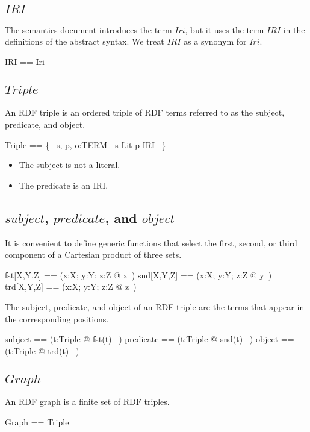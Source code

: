 \documentclass{article}
\begin{document}
\subsection{$IRI$}
The semantics document introduces the term $Iri$, but it uses the term $IRI$ in the definitions of the abstract syntax.
We treat $IRI$ as a synonym for $Iri$.
\begin{zed}
	IRI == Iri
\end{zed}

\subsection{$Triple$}
An RDF triple is an ordered triple of RDF terms referred to as the subject, predicate, and object.
\begin{zed}
	Triple == \{~ s, p, o:TERM | s \notin Lit \land p \in IRI ~\}
\end{zed}
\begin{itemize}
\item The subject is not a literal.
\item The predicate is an IRI.
\end{itemize}

\subsection{$subject$, $predicate$, and $object$}
It is convenient to define generic functions that select the first, second, or third component of a Cartesian product of three sets.
\begin{zed}
	fst[X,Y,Z] == (\lambda x:X; y:Y; z:Z @ x~)
\also
	snd[X,Y,Z] == (\lambda x:X; y:Y; z:Z @ y~)
\also
	trd[X,Y,Z] == (\lambda x:X; y:Y; z:Z @ z~)
\end{zed}

The subject, predicate, and object of an RDF triple are the terms that appear in the corresponding positions.
\begin{zed}
	subject == (\lambda t:Triple @ fst(t) ~)
\also
	predicate == (\lambda t:Triple @ snd(t) ~)
\also
	object == (\lambda t:Triple @ trd(t) ~)
\end{zed}

\subsection{$Graph$}
An RDF graph is a finite set of RDF triples.
\begin{zed}
	Graph == \finset Triple
\end{zed}
\end{document}
